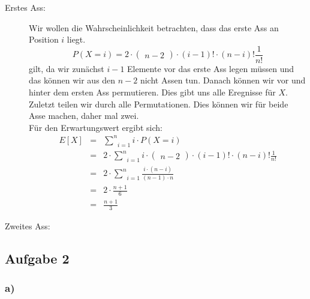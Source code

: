 \documentclass[11pt,a4paper,ngerman]{article}
\begin{document}
\begin{description}
    \item[Erstes Ass:] Wir wollen die Wahrscheinlichkeit betrachten, dass das erste Ass an Position $i$ liegt.
        \[
            P(X=i) = 2 \cdot \begin{pmatrix} n - 2 \end{pmatrix} \cdot (i-1)! \cdot (n-i)! \frac{1}{n!}
        \]
        gilt, da wir zunächst $i-1$ Elemente vor das erste Ass legen müssen und das können wir aus den $n-2$ nicht Assen tun.
        Danach können wir vor und hinter dem ersten Ass permutieren. Dies gibt uns alle Eregnisse für $X$. Zuletzt teilen wir
        durch alle Permutationen. Dies können wir für beide Asse machen, daher mal zwei.\\

        Für den Erwartungswert ergibt sich:
        \[\begin{array}{rcl}
            E[X] &=& \underset{i=1}{\overset{n}{\sum}} i \cdot P(X=i)\\
                &=& 2\cdot\underset{i=1}{\overset{n}{\sum}} i \cdot \begin{pmatrix} n - 2 \end{pmatrix} \cdot (i-1)! \cdot (n-i)! \frac{1}{n!}\\
                &=& 2\cdot\underset{i=1}{\overset{n}{\sum}} \frac{i\cdot (n-i)}{(n-1)\cdot n}\\
                &=& 2\cdot \frac{n+1}{6}\\
                &=& \frac{n+1}{3}
        \end{array}\]

    \item[Zweites Ass:]

\end{description}

\subsection*{Aufgabe 2}

\subsubsection*{a)}
\end{document}
